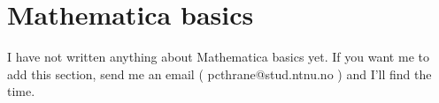 \documentclass{article}
\begin{document}


\section{Mathematica basics}
I have not written anything about Mathematica basics yet. If you want me to add this section, send me an email ( pcthrane@stud.ntnu.no ) and I'll find the time.


\end{document}
